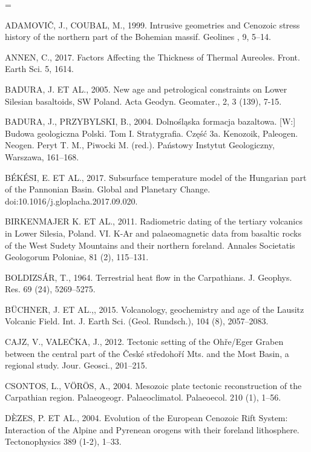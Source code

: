 \documentclass[11.5pt,twoside]{report}
\begin{document}
\begin{multicols}{3} %
	
\parskip=\smallskipamount
\setlength\parindent{0pt}

\begingroup
\footnotesize

\uppercase{AdamoviČ, J., Coubal, M., 1999.} Intrusive geometries and Cenozoic stress history of the northern part of the Bohemian massif. Geolines , 9, 5–14.

\uppercase{Annen, C., 2017.} Factors Affecting the Thickness of Thermal Aureoles. Front. Earth Sci. 5, 1614. 

\uppercase{Badura, J. et al., 2005}. New age and petrological constraints on Lower Silesian basaltoids, SW Poland. Acta Geodyn. Geomater., 2, 3 (139), 7-15.

\uppercase{Badura, J., Przybylski, B., 2004.} Dolnośląska formacja bazaltowa. [W:] Budowa geologiczna Polski. Tom I. Stratygrafia. Część 3a. Kenozoik, Paleogen. Neogen. Peryt T. M., Piwocki M. (red.). Państowy Instytut Geologiczny, Warszawa, 161–168.

\uppercase{B\'{E}k\'{E}si, E. et al., 2017.} Subsurface temperature model of the Hungarian part of the Pannonian Basin. Global and Planetary Change. doi:10.1016/j.gloplacha.2017.09.020.

\uppercase{Birkenmajer K. et al., 2011.} Radiometric dating of the tertiary volcanics in Lower Silesia, Poland. VI. K-Ar and palaeomagnetic data from basaltic rocks of the West Sudety Mountains and their northern foreland. Annales Societatis Geologorum Poloniae, 81 (2), 115–131.

\uppercase{Boldizs\'{A}r, T., 1964.} Terrestrial heat flow in the Carpathians. J. Geophys. Res. 69 (24), 5269–5275. 

\uppercase{B\"{U}chner, J. et al.,, 2015.} Volcanology, geochemistry and age of the Lausitz Volcanic Field. Int. J. Earth Sci. (Geol. Rundsch.), 104 (8), 2057–2083. 

\uppercase{Cajz, V., ValeČka, J., 2012.} Tectonic setting of the Ohře/Eger Graben between the central part of the České středohoří Mts. and the Most Basin, a regional study. Jour. Geosci., 201–215. 

\uppercase{Csontos, L., Vörös, A., 2004.} Mesozoic plate tectonic reconstruction of the Carpathian region. Palaeogeogr. Palaeoclimatol. Palaeoecol. 210 (1), 1–56. 

\uppercase{D\`{E}zes, P. et al., 2004.} Evolution of the European Cenozoic Rift System: Interaction of the Alpine and Pyrenean orogens with their foreland lithosphere. Tectonophysics 389 (1-2), 1–33.


\end{multicols}
\end{document}
